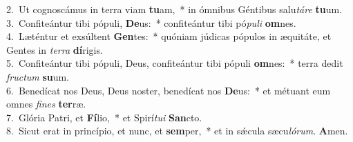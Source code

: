{2.~}Ut cognoscámus in terra viam \textbf{tu}am,~* in ómnibus Géntibus salu\textit{tá}\textit{re} \textbf{tu}um.\\
{3.~}Confiteántur tibi pópuli, \textbf{De}us:~* confiteántur tibi pó\textit{pu}\textit{li} \textbf{om}nes.\\
{4.~}Læténtur et exsúltent \textbf{Gen}tes:~* quóniam júdicas pópulos in æquitáte, et Gentes in \textit{ter}\textit{ra} \textbf{dí}rigis.\\
{5.~}Confiteántur tibi pópuli, Deus, confiteántur tibi pópuli \textbf{om}nes:~* terra dedit \textit{fru}\textit{ctum} \textbf{su}um.\\
{6.~}Benedícat nos Deus, Deus noster, benedícat nos \textbf{De}us:~* et métuant eum omnes \textit{fi}\textit{nes} \textbf{ter}ræ.\\
{7.~}Glória Patri, et \textbf{Fí}lio,~* et Spirí\textit{tu}\textit{i} \textbf{San}cto.\\
{8.~}Sicut erat in princípio, et nunc, et \textbf{sem}per,~* et in sǽcula sæcu\textit{ló}\textit{rum}. \textbf{A}men.\\
